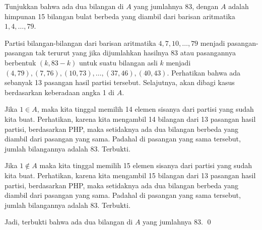 \documentclass[11pt]{scrartcl}
\begin{document}
	\newpage
	\begin{soalbaru} 
		 Tunjukkan bahwa ada dua bilangan di $A$ yang jumlahnya 83, dengan $A$ adalah himpunan 15 bilangan bulat berbeda yang diambil dari barisan aritmatika $1,4,\dots,79$.\\[-10pt]
		 
		 \begin{solusi}
		 Partisi bilangan-bilangan dari barisan aritmatika $4,7,10,\dots,79$ menjadi pasangan-pasangan tak terurut yang jika dijumlahkan hasilnya 83 atau pasangannya berbentuk $(k,83-k)$ untuk suatu bilangan asli $k$ menjadi $(4,79),(7,76),(10,73),\dots,(37,46),(40,43)$. Perhatikan bahwa ada sebanyak 13 pasangan hasil partisi tersebut. Selajutnya, akan dibagi kasus berdasarkan keberadaan angka 1 di $A$. 
		 
		 Jika $1 \in A$, maka kita tinggal memilih 14 elemen sisanya dari partisi yang sudah kita buat. Perhatikan, karena kita mengambil 14 bilangan dari 13 pasangan hasil partisi, berdasarkan PHP, maka setidaknya ada dua bilangan berbeda yang diambil dari pasangan yang sama. Padahal di pasangan yang sama tersebut, jumlah bilangannya adalah 83. Terbukti.
		 
		 Jika $1 \not \in A$ maka kita tinggal memilih 15 elemen sisanya dari partisi yang sudah kita buat. Perhatikan, karena kita mengambil 15 bilangan dari 13 pasangan hasil partisi, berdasarkan PHP, maka setidaknya ada dua bilangan berbeda yang diambil dari pasangan yang sama. Padahal di pasangan yang sama tersebut, jumlah bilangannya adalah 83. Terbukti.
		 
		 Jadi, terbukti bahwa ada dua bilangan di $A$ yang jumlahnya 83. \qed
		 
		 
		 \end{solusi}
	\end{soalbaru}
	
\end{document}
